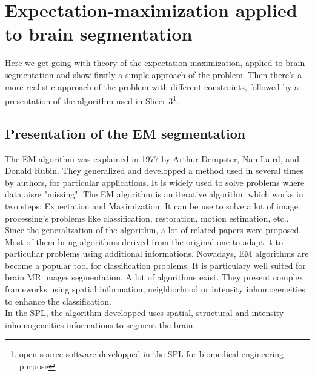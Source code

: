 \chapter{Expectation-maximization applied to brain segmentation}\label{sec:EM}
%
Here we get going with theory of the expectation-maximization, applied to brain segmentation and show firstly a simple approach of the problem. Then there's a
more realistic approach of the problem with different constraints, followed by a presentation of the algorithm used in Slicer 3\footnote{open source software developped in the SPL for biomedical engineering purpose}.
%
\section{Presentation of the EM segmentation}
The EM algorithm was explained in 1977 by Arthur Dempster, Nan Laird, and Donald Rubin\cite{1}. They generalized and developped a method used in several times by authors, for particular applications. It is widely used to solve problems where data aisre "missing".
The EM algorithm is an iterative algorithm which works in two steps: Expectation and Maximization. It can be use to solve a lot of image processing's problems like classification, restoration\cite{3}, motion estimation\cite{2}, etc.. 
Since the generalization of the algorithm, a lot of related papers were proposed. Most of them bring algorithms derived from the original one to adapt it to particuliar problems using additional informations.
Nowadays, EM algorithms are become a popular tool for classification problems.  It is particulary well suited for brain MR images segmentation.
A lot of algorithms exist. They present complex frameworks using spatial information, neighborhood or intensity inhomogeneities to enhance the classification.\\
In the SPL, the algorithm developped uses spatial, structural and intensity inhomogeneities informations to segment the brain. 
%

